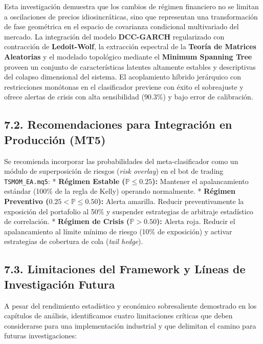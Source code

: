\documentclass[
  12pt,
]{article}
\begin{document}
Esta investigación demuestra que los cambios de régimen financiero no se
limitan a oscilaciones de precios idiosincráticas, sino que representan
una transformación de fase geométrica en el espacio de covarianza
condicional multivariado del mercado. La integración del modelo
\textbf{DCC-GARCH} regularizado con contracción de \textbf{Ledoit-Wolf},
la extracción espectral de la \textbf{Teoría de Matrices Aleatorias} y
el modelado topológico mediante el \textbf{Minimum Spanning Tree}
proveen un conjunto de características latentes altamente estables y
descriptivas del colapso dimensional del sistema. El acoplamiento
híbrido jerárquico con restricciones monótonas en el clasificador
previene con éxito el sobreajuste y ofrece alertas de crisis con alta
sensibilidad (\(90.3\%\)) y bajo error de calibración.

\subsection{7.2. Recomendaciones para Integración en Producción
(MT5)}\label{recomendaciones-para-integraciuxf3n-en-producciuxf3n-mt5}

Se recomienda incorporar las probabilidades del meta-clasificador como
un módulo de superposición de riesgos (\emph{risk overlay}) en el bot de
trading \texttt{TSMOM\_EA.mq5}: * \textbf{Régimen Estable
(\(\mathbb{P} \le 0.25\)):} Mantener el apalancamiento estándar (100\%
de la regla de Kelly) operando normalmente. * \textbf{Régimen Preventivo
(\(0.25 < \mathbb{P} \le 0.50\)):} Alerta amarilla. Reducir
preventivamente la exposición del portafolio al 50\% y suspender
estrategias de arbitraje estadístico de correlación. * \textbf{Régimen
de Crisis (\(\mathbb{P} > 0.50\)):} Alerta roja. Reducir el
apalancamiento al límite mínimo de riesgo (10\% de exposición) y activar
estrategias de cobertura de cola (\emph{tail hedge}).

\subsection{7.3. Limitaciones del Framework y Líneas de Investigación
Futura}\label{limitaciones-del-framework-y-luxedneas-de-investigaciuxf3n-futura}

A pesar del rendimiento estadístico y económico sobresaliente demostrado
en los capítulos de análisis, identificamos cuatro limitaciones críticas
que deben considerarse para una implementación industrial y que
delimitan el camino para futuras investigaciones:
\end{document}

